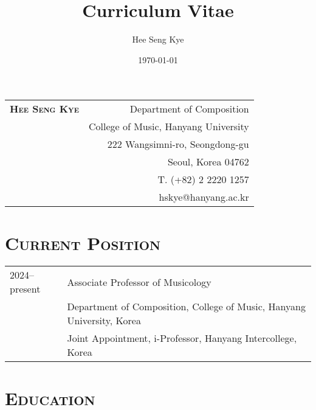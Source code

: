 \documentclass[a4paper,11pt,draft]{article}
\title{Curriculum Vitae}
\author{Hee Seng Kye}
\date{\today}
\begin{document}
  \renewcommand{\headrulewidth}{0pt}
  \fancyhf{}
  \fancyfoot[RE,RO]{\small \thepage}
  
  \raggedright \parindent=15pt
  
  \hspace*{-0.8cm}
  \begin{tabular}{p{9.72cm} r}
    {\Large \textsc{\textbf{Hee Seng Kye}}} & Department of Composition\\
    & College of Music, Hanyang University\\
    & 222 Wangsimni-ro, Seongdong-gu\\
    & Seoul, Korea 04762\\
    & T. (+82) 2 2220 1257\\
    & hskye@hanyang.ac.kr
  \end{tabular}
  
  \vspace{10mm}
  
  \section*{\textsc{Current Position}}
  
  \hspace*{-0.25cm}
  \begin{tabular}{p{2.5cm} l}
    2024--present & Associate Professor of Musicology\\
    & Department of Composition, College of Music, Hanyang University, Korea\\
    & Joint Appointment, i-Professor, Hanyang Intercollege, Korea
  \end{tabular}
  
  \vspace*{5mm}
  
  \section*{\textsc{Education}}
  
\end{document}
